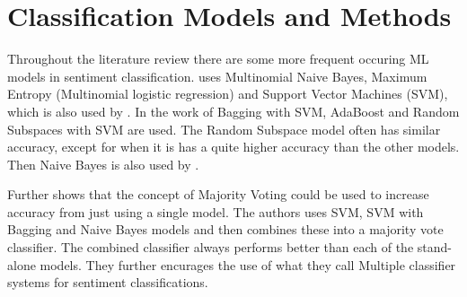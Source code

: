 \section{Classification Models and Methods}
\label{sec:classification-models}


Throughout the literature review there are some more frequent occuring ML models in sentiment classification. 
\cite{rui-xia} uses Multinomial Naive Bayes, Maximum Entropy (Multinomial logistic regression) and Support Vector Machines (SVM), which is also used by \cite{pang-bo}. 
In the work of \cite{gang-wang} Bagging with SVM, AdaBoost and Random Subspaces with SVM are used. 
The Random Subspace model often has similar accuracy, except for when it is has a quite higher accuracy than the other models. 
Then Naive Bayes is also used by \cite{pak}.


Further \cite{catal} shows that the concept of Majority Voting could be used to increase accuracy from just using a single model. 
The authors uses SVM, SVM with Bagging and Naive Bayes models and then combines these into a majority vote classifier. 
The combined classifier always performs better than each of the stand-alone models. 
They further encurages the use of what they call Multiple classifier systems for sentiment classifications.
